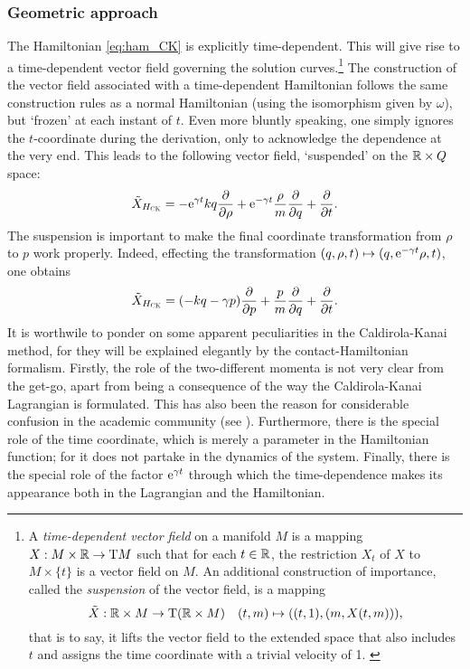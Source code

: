 \subsubsection{Geometric approach}
The Hamiltonian \cref{eq:ham_CK} is explicitly time-dependent. This will give rise to a time-dependent vector field governing the solution curves.\footnote
{A \emph{time-dependent vector field} on a manifold $M$ is a mapping $X: M\times\mathbb{R} \to \mathrm{T}M$ such that for each $t \in \mathbb{R}$, the restriction $X_t$ of $X$ to $M \times \{t\}$ is a vector field on $M$. \cite{Libermann1987} An additional construction of importance, called the \emph{suspension} of the vector field, is a mapping $$ \tilde{X}: \mathbb{R} \times M \to \mathrm{T}(\mathbb{R} \times M) \quad (t, m) \mapsto ((t, 1), (m, X(t, m))),$$ that is to say, it lifts the vector field to the extended space that also includes $t$ and assigns the time coordinate with a trivial velocity of 1. \cite{Abraham1978}}
The construction of the vector field associated with a time-dependent Hamiltonian follows the same construction rules as a normal Hamiltonian (using the isomorphism given by $\omega$), but `frozen' at each instant of $t$. Even more bluntly speaking, one simply ignores the $t$-coordinate during the derivation, only to acknowledge the dependence at the very end. This leads to the following vector field, `suspended' on the $\mathbb{R}\times Q$ space:
$$ \tilde{X}_{H_\text{\tiny{\textsc{CK}}}} = -\mathrm{e}^{\gamma t}kq\pdv{}{\ensuremath{\rho}} + \mathrm{e}^{-\gamma t}\frac{\rho}{m}\pdv{}{q} + \pdv{}{t}.$$
The suspension is important to make the final coordinate transformation from $\rho$ to $p$ work properly. Indeed, effecting the transformation $(q, \rho, t) \mapsto (q, \mathrm{e}^{-\gamma t}\rho, t)$, one obtains
$$ \tilde{X}_{H_\text{\tiny{\textsc{CK}}}} = \qty(-kq - \gamma p)\pdv{}{p} + \frac{p}{m}\pdv{}{q} + \pdv{}{t}.$$
It is worthwile to ponder on some apparent peculiarities in the Caldirola-Kanai method, for they will be explained elegantly by the contact-Hamiltonian formalism. Firstly, the role of the two-different momenta is not very clear from the get-go, apart from being a consequence of the way the Caldirola-Kanai Lagrangian is formulated. This has also been the reason for considerable confusion in the academic community (see \citet{Schuch1997}). Furthermore, there is the special role of the time coordinate, which is merely a parameter in the Hamiltonian function; for it does not partake in the dynamics of the system. Finally, there is the special role of the factor $\mathrm{e}^{\gamma t}$ through which the time-dependence makes its appearance both in the Lagrangian and the Hamiltonian.

